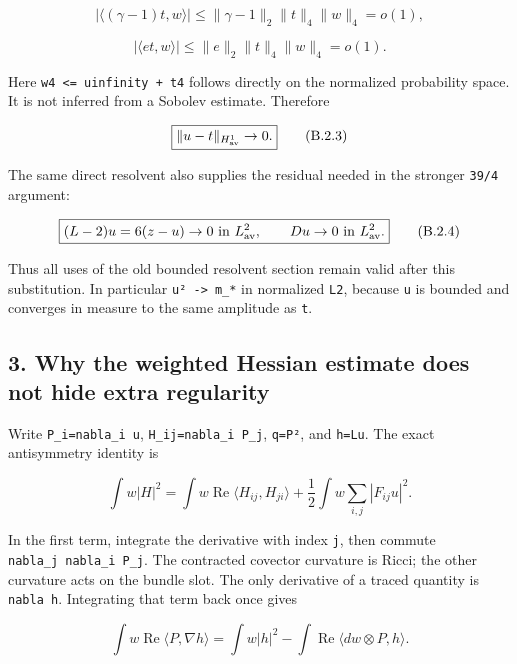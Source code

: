 \documentclass[11pt]{article}
\begin{document}
\[
 |\langle(\gamma-1)t,w\rangle|
 \le\|\gamma-1\|_2\|t\|_4\|w\|_4=o(1),
\]

\[
 |\langle et,w\rangle|
 \le\|e\|_2\|t\|_4\|w\|_4=o(1).
\]

Here
\texttt{\textbar{}\textbar{}w\textbar{}\textbar{}4\ \textless{}=\ \textbar{}\textbar{}u\textbar{}\textbar{}infinity\ +\ \textbar{}\textbar{}t\textbar{}\textbar{}4}
follows directly on the normalized probability space. It is not inferred
from a Sobolev estimate. Therefore

\[
 \boxed{\|u-t\|_{H^1_{\rm av}}\to0.}
\tag{B.2.3}
\]

The same direct resolvent also supplies the residual needed in the
stronger \texttt{39/4} argument:

\[
 \boxed{(L-2)u=6(z-u)\to0\text{ in }L^2_{\rm av},\qquad Du\to0\text{ in }L^2_{\rm av}.}
\tag{B.2.4}
\]

Thus all uses of the old bounded resolvent section remain valid after
this substitution. In particular
\texttt{\textbar{}u\textbar{}²\ -\textgreater{}\ m\_*} in normalized
\texttt{L2}, because \texttt{u} is bounded and converges in measure to
the same amplitude as \texttt{t}.

\hypertarget{why-the-weighted-hessian-estimate-does-not-hide-extra-regularity}{%
\subsection{3. Why the weighted Hessian estimate does not hide extra
regularity}\label{why-the-weighted-hessian-estimate-does-not-hide-extra-regularity}}

Write \texttt{P\_\allowbreak{}i=nabla\_\allowbreak{}i\ u}, \texttt{H\_\allowbreak{}ij=nabla\_\allowbreak{}i\ P\_\allowbreak{}j},
\texttt{q=\textbar{}P\textbar{}²}, and \texttt{h=Lu}. The exact
antisymmetry identity is

\[
 \int w|H|^2
 =\int w\operatorname{Re}\langle H_{ij},H_{ji}\rangle
 +\frac12\int w\sum_{i,j}|F_{ij}u|^2.
\]

In the first term, integrate the derivative with index \texttt{j}, then
commute \texttt{nabla\_\allowbreak{}j\ nabla\_\allowbreak{}i\ P\_\allowbreak{}j}. The contracted covector
curvature is Ricci; the other curvature acts on the bundle slot. The
only derivative of a traced quantity is \texttt{nabla\ h}. Integrating
that term back once gives

\[
 \int w\operatorname{Re}\langle P,\nabla h\rangle
 =\int w|h|^2-\int\operatorname{Re}\langle dw\otimes P,h\rangle.
\]
\end{document}
